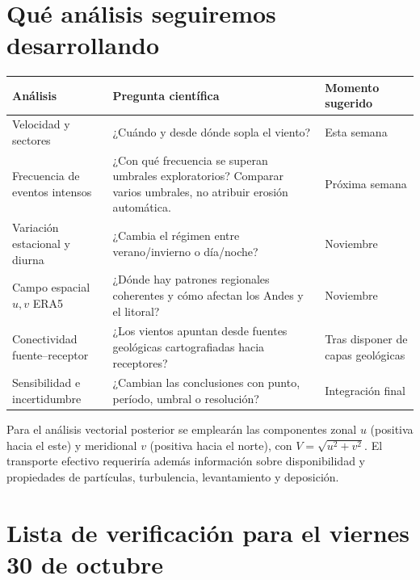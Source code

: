 \documentclass[11pt,a4paper]{article}
\begin{document}
\section{Qué análisis seguiremos desarrollando}

\begin{longtable}{p{}p{}p{}}

\toprule\textbf{Análisis} & \textbf{Pregunta científica} & \textbf{Momento sugerido}\\\midrule
Velocidad y sectores & ¿Cuándo y desde dónde sopla el viento? & Esta semana\\

Frecuencia de eventos intensos & ¿Con qué frecuencia se superan umbrales exploratorios? Comparar varios umbrales, no atribuir erosión automática. & Próxima semana\\

Variación estacional y diurna & ¿Cambia el régimen entre verano/invierno o día/noche? & Noviembre\\

Campo espacial $u,v$ ERA5 & ¿Dónde hay patrones regionales coherentes y cómo afectan los Andes y el litoral? & Noviembre\\

Conectividad fuente--receptor & ¿Los vientos apuntan desde fuentes geológicas cartografiadas hacia receptores? & Tras disponer de capas geológicas\\

Sensibilidad e incertidumbre & ¿Cambian las conclusiones con punto, período, umbral o resolución? & Integración final\\\bottomrule

\end{longtable}

Para el análisis vectorial posterior se emplearán las componentes zonal $u$ (positiva hacia el este) y meridional $v$ (positiva hacia el norte), con $V=\sqrt{u^2+v^2}$. El transporte efectivo requeriría además información sobre disponibilidad y propiedades de partículas, turbulencia, levantamiento y deposición.

\section{Lista de verificación para el viernes 30 de octubre}
\end{document}
